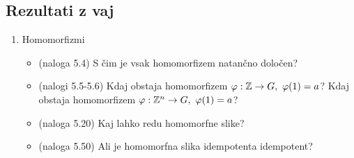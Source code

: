 \subsection*{Rezultati z vaj}
\begin{enumerate}
    \item Homomorfizmi
    \begin{itemize}
        \item (naloga 5.4) S čim je vsak homomorfizem natančno določen?
        \item (nalogi 5.5-5.6) Kdaj obstaja homomorfizem \(\varphi: \mathbb{Z} \to G, \ \varphi(1) = a\)? Kdaj obstaja homomorfizem \(\varphi: \Z^n \to G, \ \varphi(1) = a\)?
        \item (naloga 5.20) Kaj lahko redu homomorfne slike?
        \item (naloga 5.50) Ali je homomorfna slika idempotenta idempotent?
    \end{itemize}
\end{enumerate}


